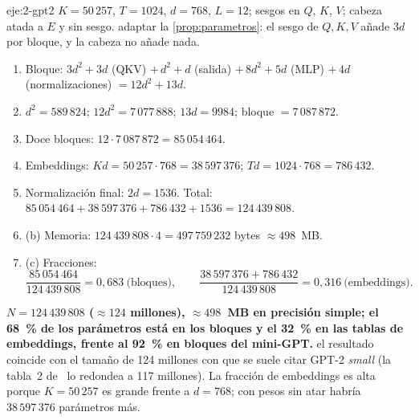 \begin{solucion}{eje:2-gpt2}
\datos $K=50\,257$, $T=1024$, $d=768$, $L=12$; sesgos en $Q$, $K$, $V$; cabeza atada a $E$ y sin sesgo.
\planteamiento adaptar la \cref{prop:parametros}: el sesgo de $Q,K,V$ añade $3d$ por bloque, y la cabeza no añade nada.
\pasos
\begin{enumerate}[label=\arabic*.]
  \item Bloque: $3d^{2}+3d$ (QKV) $+\,d^{2}+d$ (salida) $+\,8d^{2}+5d$ (MLP) $+\,4d$ (normalizaciones) $=12d^{2}+13d$.
  \item $d^{2}=589\,824$; $12d^{2}=7\,077\,888$; $13d=9984$; bloque $=7\,087\,872$.
  \item Doce bloques: $12\cdot 7\,087\,872=85\,054\,464$.
  \item Embeddings: $Kd=50\,257\cdot 768=38\,597\,376$; $Td=1024\cdot 768=786\,432$.
  \item Normalización final: $2d=1536$. Total: $85\,054\,464+38\,597\,376+786\,432+1536=124\,439\,808$.
  \item (b) Memoria: $124\,439\,808\cdot 4=497\,759\,232$ bytes $\approx 498$~MB.
  \item (c) Fracciones:
  \[
  \frac{85\,054\,464}{124\,439\,808}=0{,}683\ \text{(bloques)},\qquad \frac{38\,597\,376+786\,432}{124\,439\,808}=0{,}316\ \text{(embeddings)}.
  \]
\end{enumerate}
\resultado \textbf{$N=124\,439\,808$ ($\approx 124$ millones), $\approx 498$~MB en precisión simple; el 68~\% de los parámetros está en los bloques y el 32~\% en las tablas de embeddings, frente al 92~\% en bloques del mini-GPT.}
\comprobacion el resultado coincide con el tamaño de 124 millones con que se suele citar GPT-2 \emph{small} (la tabla~2 de~\cite{gpt2} lo redondea a 117 millones). La fracción de embeddings es alta porque $K=50\,257$ es grande frente a $d=768$; con pesos sin atar habría $38\,597\,376$ parámetros más.
\end{solucion}

